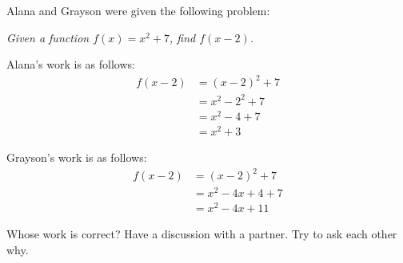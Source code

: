 \documentclass[noauthor]{ximera}
\begin{document}
\begin{problem}
Alana and Grayson were given the following problem:

\textit{Given a function \(f(x) = x^2 + 7\), find \(f(x - 2)\).}

Alana's work is as follows:
    \begin{align*}
        f(x - 2) & = (x - 2)^2 + 7 \\
        & = x^2 - 2^2 + 7 \\
        & = x^2 - 4 + 7 \\
        & = x^2 + 3
    \end{align*}

Grayson's work is as follows:
    \begin{align*}
        f(x - 2) & = (x - 2)^2 + 7 \\
        & = x^2 - 4x + 4 + 7 \\
        & = x^2 - 4x + 11
    \end{align*}

Whose work is correct? Have a discussion with a partner. Try to ask
each other why.
\end{problem}
\end{document}
